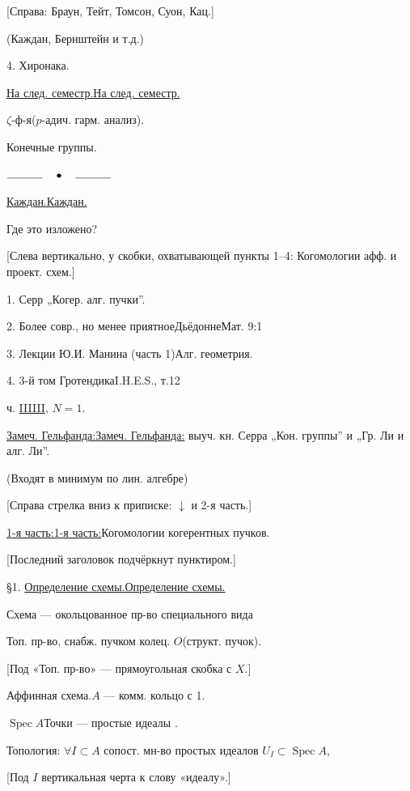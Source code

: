 \documentclass[11pt]{article}
\theoremstyle{definition}
\theoremstyle{remark}
\newcommand{\Unclear}[3]{%
  \begingroup\color{orange!70!black}%
  [Unresolved reading #1/#2: #3]\endgroup%
}
\renewcommand{\Unclear}[3]{%
  \begingroup\color{orange!65!black}%
  \ifmmode\text{[неясно: #3]}\else[неясно: #3]\fi\endgroup%
}
\let\DiplomaticMathUnderline\underline
\renewcommand{\underline}[1]{\ifmmode\DiplomaticMathUnderline{#1}\else\uline{#1}\fi}
\begin{document}
[Справа: Браун, Тейт, Томсон, Суон, Кац.]

(Каждан, Бернштейн и т.д.)

4. Хиронака.

\underline{На след. семестр.}

$\zeta$-ф-я\qquad ($p$-адич. гарм. анализ).

Конечные группы.

\begin{center}$\rule{1.1cm}{0.4pt}\quad\bullet\quad\rule{1.1cm}{0.4pt}$\end{center}

\underline{Каждан.}

Где это изложено?

[Слева вертикально, у скобки, охватывающей пункты 1–4:
Когомологии афф. и проект. схем.]

1. Серр „Когер. алг. пучки”.

2. Более совр., но менее приятное\qquad Дьёдонне\qquad Мат. 9:1

3. Лекции Ю.И. Манина (часть 1)\qquad Алг. геометрия.

4. 3-й том Гротендика\qquad I.H.E.S., т.12

ч. \underline{III}, $N=1$.

\underline{Замеч. Гельфанда:} выуч. кн. Серра „Кон. группы” и „Гр. Ли и алг. Ли”.

(Входят в минимум по лин. алгебре)

[Справа стрелка вниз к приписке: $\downarrow$ и 2-я часть.]

\underline{1-я часть:}\qquad Когомологии когерентных пучков.

[Последний заголовок подчёркнут пунктиром.]

§1. \underline{Определение схемы.}

Схема — окольцованное пр-во специального вида

Топ. пр-во, снабж. пучком колец. $O$\qquad (структ. пучок).

[Под «Топ. пр-во» — прямоугольная скобка с $X$.]

Аффинная схема.\qquad $A$ — комм. кольцо с 1.

$\operatorname{Spec}A$\qquad Точки — простые идеалы
\Unclear{GELFAND-P000296}{prime-ideal-symbol}{$\wp\subset A$}.

Топология: $\forall I\subset A$ сопост. мн-во простых идеалов $U_I\subset\operatorname{Spec}A$,

[Под $I$ вертикальная черта к слову «идеалу».]
\end{document}
